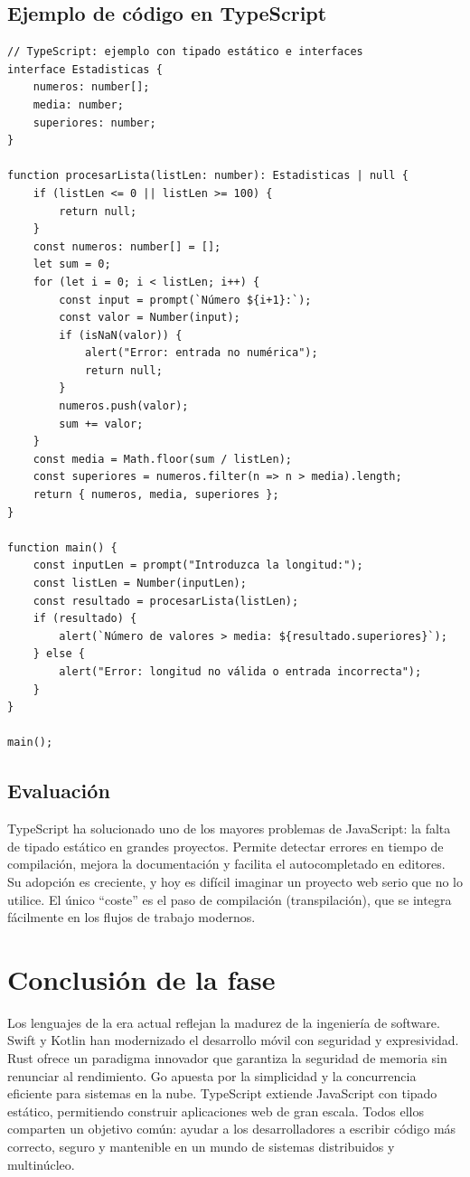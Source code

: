 \subsection{Ejemplo de código en TypeScript}

\begin{verbatim}
// TypeScript: ejemplo con tipado estático e interfaces
interface Estadisticas {
    numeros: number[];
    media: number;
    superiores: number;
}

function procesarLista(listLen: number): Estadisticas | null {
    if (listLen <= 0 || listLen >= 100) {
        return null;
    }
    const numeros: number[] = [];
    let sum = 0;
    for (let i = 0; i < listLen; i++) {
        const input = prompt(`Número ${i+1}:`);
        const valor = Number(input);
        if (isNaN(valor)) {
            alert("Error: entrada no numérica");
            return null;
        }
        numeros.push(valor);
        sum += valor;
    }
    const media = Math.floor(sum / listLen);
    const superiores = numeros.filter(n => n > media).length;
    return { numeros, media, superiores };
}

function main() {
    const inputLen = prompt("Introduzca la longitud:");
    const listLen = Number(inputLen);
    const resultado = procesarLista(listLen);
    if (resultado) {
        alert(`Número de valores > media: ${resultado.superiores}`);
    } else {
        alert("Error: longitud no válida o entrada incorrecta");
    }
}

main();
\end{verbatim}

\subsection{Evaluación}

TypeScript ha solucionado uno de los mayores problemas de JavaScript: la falta de tipado estático en grandes proyectos. Permite detectar errores en tiempo de compilación, mejora la documentación y facilita el autocompletado en editores. Su adopción es creciente, y hoy es difícil imaginar un proyecto web serio que no lo utilice. El único ``coste'' es el paso de compilación (transpilación), que se integra fácilmente en los flujos de trabajo modernos.

\section{Conclusión de la fase}

Los lenguajes de la era actual reflejan la madurez de la ingeniería de software. Swift y Kotlin han modernizado el desarrollo móvil con seguridad y expresividad. Rust ofrece un paradigma innovador que garantiza la seguridad de memoria sin renunciar al rendimiento. Go apuesta por la simplicidad y la concurrencia eficiente para sistemas en la nube. TypeScript extiende JavaScript con tipado estático, permitiendo construir aplicaciones web de gran escala. Todos ellos comparten un objetivo común: ayudar a los desarrolladores a escribir código más correcto, seguro y mantenible en un mundo de sistemas distribuidos y multinúcleo.
